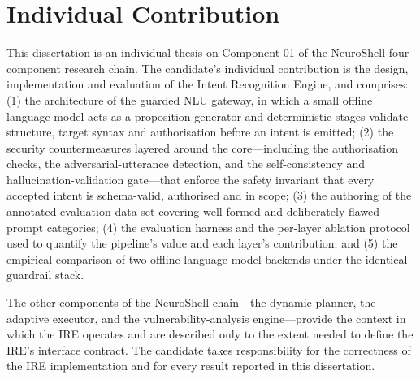 \section{Individual Contribution}\label{sec:individual-contribution}

This dissertation is an individual thesis on Component 01 of the NeuroShell
four-component research chain. The candidate's individual contribution is the
design, implementation and evaluation of the Intent Recognition Engine, and
comprises: (1) the architecture of the guarded NLU gateway, in which a small
offline language model acts as a proposition generator and deterministic stages
validate structure, target syntax and authorisation before an intent is
emitted; (2) the security countermeasures layered around the core---including
the authorisation checks, the adversarial-utterance detection, and the
self-consistency and hallucination-validation gate---that enforce the safety
invariant that every accepted intent is schema-valid, authorised and in scope;
(3) the authoring of the annotated evaluation data set covering well-formed and
deliberately flawed prompt categories; (4) the evaluation harness and the
per-layer ablation protocol used to quantify the pipeline's value and each
layer's contribution; and (5) the empirical comparison of two offline
language-model backends under the identical guardrail stack.

The other components of the NeuroShell chain---the dynamic planner, the
adaptive executor, and the vulnerability-analysis engine---provide the context
in which the IRE operates and are described only to the extent needed to define
the IRE's interface contract. The candidate takes responsibility for the
correctness of the IRE implementation and for every result reported in this
dissertation.